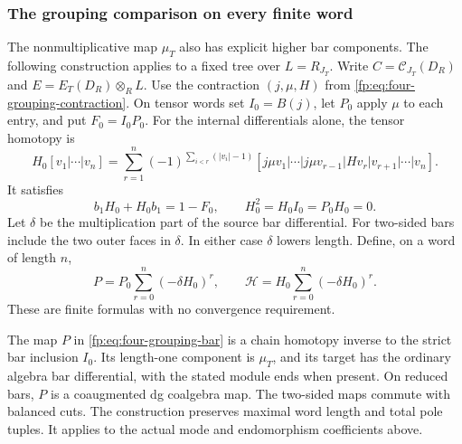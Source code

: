 \subsubsection{The grouping comparison on every finite word}

The nonmultiplicative map \(\mu_T\) also has explicit higher
bar components.  The following construction applies to a fixed tree
over \(L=R_{J_T}\).  Write \(C=\mathcal C_{J_T}(D_R)\)
and \(E=E_T(D_R)\otimes_RL\).  Use the contraction
\((j,\mu,H)\) from \eqref{fp:eq:four-grouping-contraction}.
On tensor words set \(I_0=B(j)\), let \(P_0\) apply
\(\mu\) to each entry, and put \(F_0=I_0P_0\).
For the internal differentials alone, the tensor homotopy is
\[
 H_0[v_1|\cdots|v_n]=
 \sum_{r=1}^n(-1)^{\sum_{i<r}(|v_i|-1)}
 [j\mu v_1|\cdots|j\mu v_{r-1}|Hv_r|v_{r+1}|\cdots|v_n].
\]
It satisfies
\[
 b_1H_0+H_0b_1=1-F_0,\qquad
 H_0^2=H_0I_0=P_0H_0=0.
\]
Let \(\delta\) be the multiplication part of the source bar
differential.  For two-sided bars include the two outer faces in
\(\delta\).  In either case \(\delta\) lowers length.
Define, on a word of length \(n\),
\begin{equation}\label{fp:eq:four-grouping-bar}
 P=P_0\sum_{r=0}^{n}(-\delta H_0)^r,
 \qquad
 \mathcal H=H_0\sum_{r=0}^{n}(-\delta H_0)^r.
\end{equation}
These are finite formulas with no convergence requirement.

\begin{theorem}
\label{fp:thm:four-grouping-bar}
The map \(P\) in \eqref{fp:eq:four-grouping-bar} is a chain
homotopy inverse to the strict bar inclusion \(I_0\).
Its length-one component is \(\mu_T\), and its target has the
ordinary algebra bar differential, with the stated module ends
when present.  On reduced bars, \(P\) is a coaugmented dg
coalgebra map.  The two-sided maps commute with balanced cuts.
The construction preserves maximal word length and total pole tuples.
It applies to the actual mode and endomorphism coefficients above.
\end{theorem}

